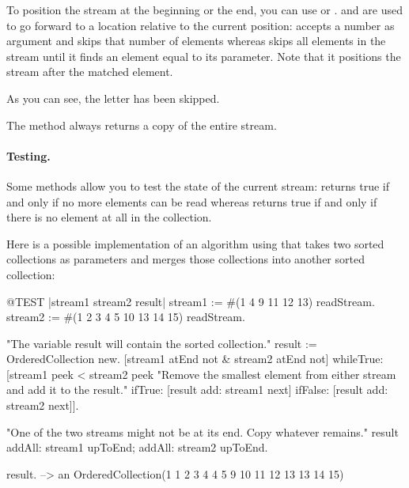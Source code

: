 \documentclass[a4paper,10pt,twoside]{book}
\begin{document}
To position the stream at the beginning or the end,
you can use  or .
 and  are used to go forward to a location relative to the current position:
 accepts a number as argument and skips that number of elements whereas  skips all elements in the stream until it finds an element equal to its parameter.
Note that it positions the stream after the matched element.


As you can see, the letter  has been skipped.

The method  always returns a copy of the entire stream.

\paragraph{Testing.} Some methods allow you to test the state of the current stream:
 returns true if and only if no more elements can be read whereas  returns true if and only if there is no element at all in the collection.

Here is a possible implementation of an algorithm using  that takes two sorted collections as parameters and merges those collections into another sorted collection:

\begin{code}{@TEST |stream1 stream2 result|}
stream1 := #(1 4 9 11 12 13) readStream.
stream2 := #(1 2 3 4 5 10 13 14 15) readStream.

"The variable result will contain the sorted collection."
result := OrderedCollection new.
[stream1 atEnd not & stream2 atEnd not]
	whileTrue: [stream1 peek < stream2 peek
		"Remove the smallest element from either stream and add it to the result."
		ifTrue: [result add: stream1 next]
		ifFalse: [result add: stream2 next]].

"One of the two streams might not be at its end. Copy whatever remains."
result
	addAll: stream1 upToEnd;
	addAll: stream2 upToEnd.

result. -->   an OrderedCollection(1 1 2 3 4 4 5 9 10 11 12 13 13 14 15)
\end{code}
\end{document}

